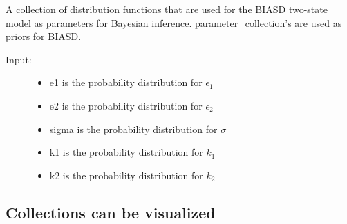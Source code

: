 \documentclass[letterpaper,10pt,english]{sphinxmanual}
\begin{document}
\begin{fulllineitems}
\label{code_distributions:distributions.parameter_collection}
A collection of distribution functions that are used for the BIASD two-state model as parameters for Bayesian inference. parameter\_collection's are used as priors for BIASD.
\begin{description}
\item[{Input:}] \leavevmode\begin{itemize}
\item {} 
e1 is the probability distribution for \(\epsilon_1\)

\item {} 
e2 is the probability distribution for \(\epsilon_2\)

\item {} 
sigma is the probability distribution for \(\sigma\)

\item {} 
k1 is the probability distribution for \(k_1\)

\item {} 
k2 is the probability distribution for \(k_2\)

\end{itemize}

\end{description}

\end{fulllineitems}



\subsection{Collections can be visualized}
\label{code_distributions:collections-can-be-visualized}
\end{document}
